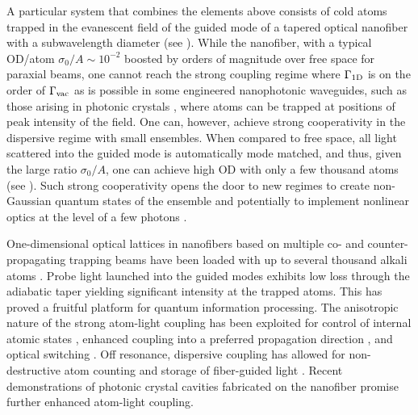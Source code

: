 \documentclass[aps,pra,twocolumn]{revtex4-1} %
\newcommand{\oneD}{{\rm 1D}}
\newcommand{\vac}{{\rm vac}}
\begin{document}
A particular system that combines the elements above consists of cold atoms trapped in the evanescent field of the guided mode of a tapered optical nanofiber with a subwavelength diameter \cite{vetsch_optical_2010, lacroute_state-insensitive_2012, balykin_quantum_2014} (see ).  
While the nanofiber, with a typical OD/atom $\sigma_0/A \sim  10^{-2}$ boosted by orders of magnitude over free space for paraxial beams, one cannot reach the strong coupling regime where $\Gamma_{\oneD}$ is on the order of $\Gamma_{\vac}$ as is possible in some engineered nanophotonic waveguides, such as those arising in photonic crystals \cite{hung_trapped_2013}, where atoms can be trapped at positions of peak intensity of the field.  
One can, however, achieve strong cooperativity in the dispersive regime with small ensembles.  When compared to free space, all light scattered into the guided mode is automatically mode matched, and thus, given the large ratio $\sigma_0/A$, one can achieve high OD with only a few thousand atoms (see ).  
Such strong cooperativity opens the door to new regimes to create non-Gaussian quantum states of the ensemble \cite{dubost_efficient_2012} and potentially to implement nonlinear optics at the level of a few photons \cite{spillane_observation_2008, pittman_ultralow-power_2013, oshea_fiber-optical_2013}.



One-dimensional optical lattices in nanofibers based on multiple co- and counter-propagating trapping beams have been loaded with up to several thousand alkali atoms \cite{vetsch_optical_2010, lacroute_state-insensitive_2012}.
Probe light launched into the guided modes exhibits low loss through the adiabatic taper \cite{hoffman_ultrahigh_2014} yielding significant intensity at the trapped atoms.
This has proved a fruitful platform for quantum information processing.  
The anisotropic nature of the strong atom-light coupling has been exploited for control of internal atomic states \cite{mitsch_exploiting_2014}, enhanced coupling into a preferred propagation direction \cite{petersen_chiral_2014, mitsch_quantum_2014}, and optical switching \cite{oshea_fiber-optical_2013}. 
Off resonance, dispersive coupling has allowed for non-destructive atom counting \cite{dawkins_dispersive_2011, beguin_generation_2014} 
and storage of fiber-guided light \cite{gouraud_demonstration_2015, sayrin_storage_2015}.
Recent demonstrations of photonic crystal cavities fabricated on the nanofiber \cite{wuttke_nanofiber_2012, nayak_optical_2014, schell_highly_2015} promise further enhanced atom-light coupling.
\end{document}
